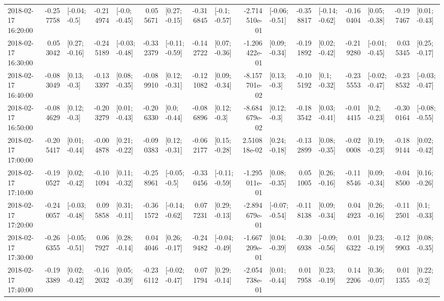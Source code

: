 \begin{tabular}{lrlrlrlrlrlrlrlrl}
2018-02-17 16:20:00 & -0.257758 &   [-0.04; -0.5] & -0.214974 &   [-0.0; -0.45] &  0.055671 &   [0.27; -0.15] & -0.316845 &   [-0.1; -0.57] & -2.714510e-01 &  [-0.06; -0.51] & -0.358817 &  [-0.14; -0.62] & -0.160404 &   [0.05; -0.38] & -0.197467 &   [0.01; -0.43] \\
2018-02-17 16:30:00 &  0.053042 &   [0.27; -0.16] & -0.245189 &  [-0.03; -0.48] & -0.332379 &  [-0.11; -0.59] & -0.142722 &   [0.07; -0.36] & -1.206422e-01 &   [0.09; -0.34] & -0.191892 &   [0.02; -0.42] & -0.219280 &  [-0.01; -0.45] &  0.035345 &   [0.25; -0.17] \\
2018-02-17 16:40:00 & -0.083049 &    [0.13; -0.3] & -0.133397 &   [0.08; -0.35] & -0.089910 &   [0.12; -0.31] & -0.121082 &   [0.09; -0.34] & -8.157701e-02 &    [0.13; -0.3] & -0.105192 &    [0.1; -0.32] & -0.235553 &  [-0.02; -0.47] & -0.238532 &  [-0.03; -0.47] \\
2018-02-17 16:50:00 & -0.084629 &    [0.12; -0.3] & -0.203279 &   [0.01; -0.43] & -0.206330 &    [0.0; -0.44] & -0.086896 &    [0.12; -0.3] & -8.684679e-02 &    [0.12; -0.3] & -0.183542 &   [0.03; -0.41] & -0.014415 &    [0.2; -0.23] & -0.300164 &  [-0.08; -0.55] \\
2018-02-17 17:00:00 & -0.205417 &   [0.01; -0.44] & -0.004878 &   [0.21; -0.22] & -0.090383 &   [0.12; -0.31] & -0.062177 &   [0.15; -0.28] &  2.510818e-02 &   [0.24; -0.18] & -0.132899 &   [0.08; -0.35] & -0.020008 &   [0.19; -0.23] & -0.189144 &   [0.02; -0.42] \\
2018-02-17 17:10:00 & -0.190527 &   [0.02; -0.42] & -0.101094 &   [0.11; -0.32] & -0.258961 &   [-0.05; -0.5] & -0.330456 &  [-0.11; -0.59] & -1.295011e-01 &   [0.08; -0.35] &  0.051005 &   [0.26; -0.16] & -0.118546 &   [0.09; -0.34] & -0.048500 &   [0.16; -0.26] \\
2018-02-17 17:20:00 & -0.240057 &  [-0.03; -0.48] &  0.095858 &   [0.31; -0.11] & -0.361572 &  [-0.14; -0.62] &  0.077231 &   [0.29; -0.13] & -2.894679e-01 &  [-0.07; -0.54] & -0.118138 &   [0.09; -0.34] &  0.044923 &   [0.26; -0.16] & -0.112501 &    [0.1; -0.33] \\
2018-02-17 17:30:00 & -0.266355 &  [-0.05; -0.51] &  0.067927 &   [0.28; -0.14] &  0.044046 &   [0.26; -0.17] & -0.249482 &  [-0.04; -0.49] & -1.667209e-01 &   [0.04; -0.39] & -0.306938 &  [-0.09; -0.56] &  0.016322 &   [0.23; -0.19] & -0.129903 &   [0.08; -0.35] \\
2018-02-17 17:40:00 & -0.193389 &   [0.02; -0.42] & -0.162032 &   [0.05; -0.39] & -0.236112 &  [-0.02; -0.47] &  0.071794 &   [0.29; -0.14] & -2.054738e-01 &   [0.01; -0.44] &  0.017958 &   [0.23; -0.19] &  0.142206 &   [0.36; -0.07] &  0.011355 &    [0.22; -0.2] \\

\end{tabular}
